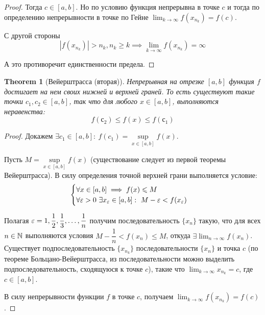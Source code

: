 \documentclass[a4paper]{article}
\theoremstyle{named}
\newtheorem*{namedtheorem}{Theorem}
\begin{document}
\begin{colloq}
\begin{proof}
			Тогда $c \in [a, b]$. Но по условию функция непрерывна в точке $c$ и тогда по определению непрерывности в точке по Гейне $\lim_{k \to \infty} f(x_{n_k}) = f(c)$.

			С другой стороны
			\begin{equation*}
				|f(x_{n_k})| > n_k, n_k \geq k \implies \lim_{k \to \infty} f(x_{n_k}) = \infty
			\end{equation*}

			А это противоречит единственности предела.
		\end{proof}

		\begin{namedtheorem}[Вейерштрасса (вторая)]
			Непрерывная на отрезке $[a, b]$ функция $f$ достигает на нем своих нижней и верхней граней. То есть существуют такие точки $c_1, c_2 \in [a, b]$, так что для любого $x \in [a, b]$, выполняются неравенства:
			\begin{equation*}
				f(с_2) \leq f(x) \leq f(с_1)
			\end{equation*}
		\end{namedtheorem}

		\begin{proof}
			Докажем $\exists c_1 \in [a, b]: \ f(c_1) = \sup\limits_{x \in [a, b]} f(x)$.

			Пусть $M = \sup\limits_{x \in [a, b]} f(x)$ (существование следует из первой теоремы Вейерштрасса). В силу определения точной верхней грани выполняется условие:
			\begin{equation*}
				\begin{cases}
					\forall x \in [a, b] \implies f(x) \leq M \\
					\forall \eps > 0 \ \exists x_{\eps} \in [a, b]: \ M - \eps < f(x_{\eps}) \\
				\end{cases}
			\end{equation*}

			Полагая $\varepsilon = 1, \dfrac{1}{2}, \dfrac{1}{3}, \dots, \dfrac{1}{n}$ получим последовательность $\{x_n\}$ такую, что для всех $n \in \mathbb{N}$ выполняются условия $M - \dfrac{1}{n} < f(x_n) \leq M$, откуда $\exists \lim_{n \to \infty} f(x_n)$. Существует подпоследовательность $\{x_{n_k}\}$ последовательности $\{x_n\}$ и точка $c$ (по теореме Больцано-Вейерштрасса, из последовательности можно выделить подпоследовательность, сходящуюся к точке $c$), такие что $\lim_{k \to \infty} x_{n_k} = c$, где $c \in [a, b]$.

			В силу непрерывности функции $f$ в точке $c$, получаем $\lim_{k \to \infty} f(x_{n_k}) = f(c)$.


\end{proof}
\end{colloq}
\end{document}
